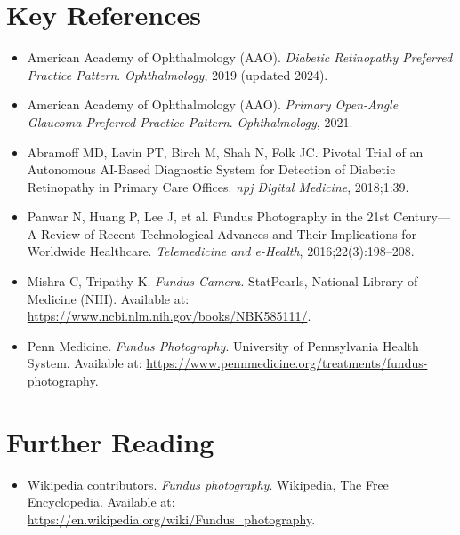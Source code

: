 \section{Key References}

\begin{itemize}
    \item American Academy of Ophthalmology (AAO). \textit{Diabetic Retinopathy Preferred Practice Pattern}. \textit{Ophthalmology}, 2019 (updated 2024).
    \item American Academy of Ophthalmology (AAO). \textit{Primary Open-Angle Glaucoma Preferred Practice Pattern}. \textit{Ophthalmology}, 2021.
    \item Abramoff MD, Lavin PT, Birch M, Shah N, Folk JC. Pivotal Trial of an Autonomous AI-Based Diagnostic System for Detection of Diabetic Retinopathy in Primary Care Offices. \textit{npj Digital Medicine}, 2018;1:39.
    \item Panwar N, Huang P, Lee J, et al. Fundus Photography in the 21st Century---A Review of Recent Technological Advances and Their Implications for Worldwide Healthcare. \textit{Telemedicine and e-Health}, 2016;22(3):198--208.
    \item Mishra C, Tripathy K. \textit{Fundus Camera}. StatPearls, National Library of Medicine (NIH). Available at: \url{https://www.ncbi.nlm.nih.gov/books/NBK585111/}.
    \item Penn Medicine. \textit{Fundus Photography}. University of Pennsylvania Health System. Available at: \url{https://www.pennmedicine.org/treatments/fundus-photography}.
\end{itemize}

\section{Further Reading}
\begin{itemize}
  \item Wikipedia contributors. \textit{Fundus photography}. Wikipedia, The Free Encyclopedia. Available at: \url{https://en.wikipedia.org/wiki/Fundus_photography}.
\end{itemize}
